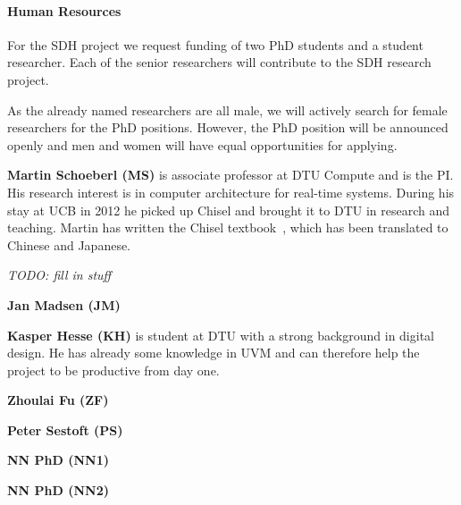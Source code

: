 \documentclass[fleqn,12pt]{article}
\newcommand{\todo}[1]{{\it TODO: #1}}
\begin{document}
\paragraph*{Human Resources}

For the SDH project we request funding of two PhD students and a student researcher.
Each of the senior researchers will contribute to the SDH research project.


As the already named researchers are all male, we will actively search
for female researchers for the PhD positions.
However, the PhD position will be announced openly and men and women
will have equal opportunities for applying.


{\bf Martin Schoeberl (MS)} is associate professor at DTU Compute and is the PI.
His research interest is in computer architecture for real-time systems. During his stay
at UCB in 2012 he picked up Chisel and brought it to DTU in research and teaching.
Martin has written the Chisel textbook~\cite{chisel:book}, which has been translated
to Chinese and Japanese.

\todo{fill in stuff}

{\bf Jan Madsen (JM)} 

{\bf Kasper Hesse (KH)} is student at DTU with a strong background in digital design.
He has already some knowledge in UVM and can therefore help the project to be productive
from day one.

{\bf Zhoulai Fu (ZF)} 

{\bf Peter Sestoft (PS)} 

{\bf NN PhD (NN1)} 

{\bf NN PhD (NN2)} 


%
\end{document}
